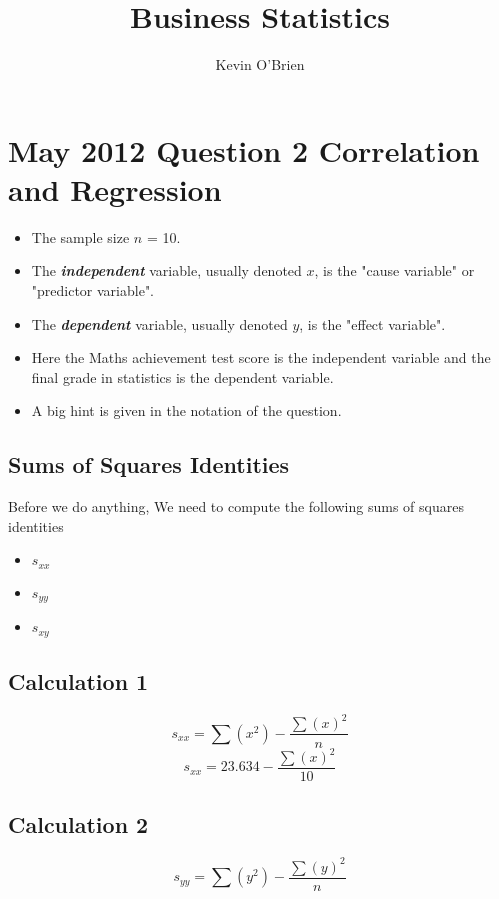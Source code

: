 \documentclass[12pts]{article}
\title{Business Statistics}
\author{Kevin O'Brien}
\begin{document}
\maketitle


\section*{May 2012 Question 2 Correlation and Regression}
\begin{itemize}
\item The sample size $n$ = 10.
\item The \textbf{\textit{independent}} variable, usually denoted $x$, is the "cause variable" or "predictor variable".
\item The \textbf{\textit{dependent}} variable, usually denoted $y$, is the "effect variable".
\item Here the Maths achievement test score is the independent variable and the final grade in statistics is the dependent variable.
\item A big hint is given in the notation of the question.
\end{itemize}


\subsection*{Sums of Squares Identities}
Before we do anything, We need to compute the following sums of squares identities
\begin{itemize}
\item $s_{xx}$
\item $s_{yy}$
\item $s_{xy}$
\end{itemize}
\subsection*{Calculation 1}
\[ s_{xx}  = \sum(x^2) - \frac{\sum(x)^2}{n} \]
\[ s_{xx}  = 23.634 - \frac{\sum(x)^2}{10} \]

\subsection*{Calculation 2}
\[ s_{yy}  = \sum(y^2) - \frac{\sum(y)^2}{n} \]
\end{document}
